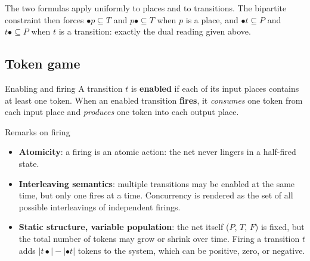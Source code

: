 The two formulas apply uniformly to places and to transitions. The bipartite constraint then forces $\bullet p \subseteq T$ and $p \bullet \subseteq T$ when $p$ is a place, and $\bullet t \subseteq P$ and $t \bullet \subseteq P$ when $t$ is a transition: exactly the dual reading given above.

\subsection{Token game}


\begin{definitionbox}{Enabling and firing}
A transition $t$ is \textbf{enabled} if each of its input places contains at least one token. When an enabled transition \textbf{fires}, it \emph{consumes} one token from each input place and \emph{produces} one token into each output place.
\end{definitionbox}

\begin{notebox}{Remarks on firing}
\begin{itemize}
  \item \textbf{Atomicity}: a firing is an atomic action: the net never lingers in a half-fired state.
  \item \textbf{Interleaving semantics}: multiple transitions may be enabled at the same time, but only one fires at a time. Concurrency is rendered as the set of all possible interleavings of independent firings.
  \item \textbf{Static structure, variable population}: the net itself ($P$, $T$, $F$) is fixed, but the total number of tokens may grow or shrink over time. Firing a transition $t$ adds $|t\bullet| - |\bullet t|$ tokens to the system, which can be positive, zero, or negative.
\end{itemize}
\end{notebox}

